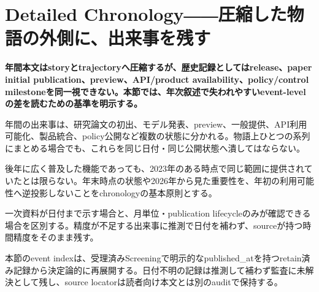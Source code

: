 \section{Detailed Chronology――圧縮した物語の外側に、出来事を残す}
\label{pkg:annual-chronology}
\noindent\textbf{年間本文はstoryとtrajectoryへ圧縮するが、歴史記録としてはrelease、paper initial publication、preview、API/product availability、policy/control milestoneを同一視できない。本節では、年次叙述で失われやすいevent-levelの差を読むための基準を明示する。}

年間の出来事は、研究論文の初出、モデル発表、preview、一般提供、API利用可能化、製品統合、policy公開など複数の状態に分かれる。物語上ひとつの系列にまとめる場合でも、これらを同じ日付・同じ公開状態へ潰してはならない。


後年に広く普及した機能であっても、2023年のある時点で同じ範囲に提供されていたとは限らない。年末時点の状態や2026年から見た重要性を、年初の利用可能性へ逆投影しないことをchronologyの基本原則とする。


一次資料が日付まで示す場合と、月単位・publication lifecycleのみが確認できる場合を区別する。精度が不足する出来事に推測で日付を補わず、sourceが持つ時間精度をそのまま残す。


本節のevent indexは、受理済みScreeningで明示的なpublished\_atを持つretain済み記録から決定論的に再展開する。日付不明の記録は推測して補わず監査に未解決として残し、source locatorは読者向け本文とは別のauditで保持する。
